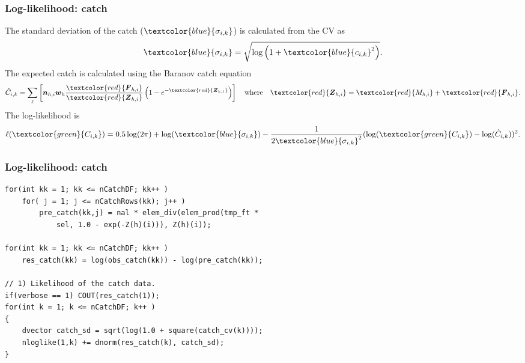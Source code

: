 \documentclass{beamer}
\begin{document}

\begin{frame}
\frametitle{Log-likelihood: catch}
The standard deviation of the catch ($\textcolor{blue}{\sigma_{i,k}}$) is calculated
from the CV as
\begin{equation*}
  \textcolor{blue}{\sigma_{i,k}} = \sqrt{\log \left( 1+\textcolor{blue}{c_{i,k}}^2 \right)}.
\end{equation*}
The expected catch is calculated using the Baranov catch equation
\begin{equation*}
  \hat{C}_{i,k} = \sum_{\ell} \left[ \boldsymbol{n}_{h,i} \boldsymbol{w}_{h}
    \frac{\textcolor{red}{\boldsymbol{F}_{h,i}}}{\textcolor{red}{\boldsymbol{Z}_{h,i}}} 
    \left( 1 - e^{-\textcolor{red}{\boldsymbol{Z}_{h,i}}} \right) \right] \quad \text{where}
  \quad \textcolor{red}{\boldsymbol{Z}_{h,i}}
  = \textcolor{red}{M_{h,i}} + \textcolor{red}{\boldsymbol{F}_{h,i}}.
\end{equation*}
The log-likelihood is
\begin{equation*}
  \ell(\textcolor{green}{C_{i,k}}) = 0.5 \log (2 \pi) + \log
  (\textcolor{blue}{\sigma_{i,k}}) -
  \frac{1}{2\textcolor{blue}{\sigma_{i,k}}^2} (\log (\textcolor{green}{C_{i,k}})
  - \log (\hat{C}_{i,k}))^2.
\end{equation*}
\end{frame}


\begin{frame}[fragile]
\frametitle{Log-likelihood: catch}
\begin{verbatim}
for(int kk = 1; kk <= nCatchDF; kk++ )
    for( j = 1; j <= nCatchRows(kk); j++ )
        pre_catch(kk,j) = nal * elem_div(elem_prod(tmp_ft * 
            sel, 1.0 - exp(-Z(h)(i))), Z(h)(i));

for(int kk = 1; kk <= nCatchDF; kk++ )
    res_catch(kk) = log(obs_catch(kk)) - log(pre_catch(kk));

// 1) Likelihood of the catch data.
if(verbose == 1) COUT(res_catch(1));
for(int k = 1; k <= nCatchDF; k++ )
{
    dvector catch_sd = sqrt(log(1.0 + square(catch_cv(k))));
    nloglike(1,k) += dnorm(res_catch(k), catch_sd);
}
\end{verbatim}
\end{frame}

\end{document}
